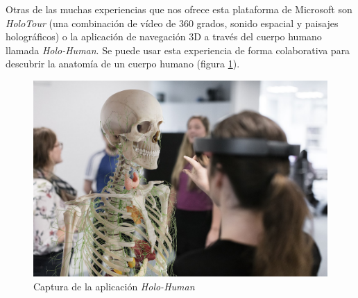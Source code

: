 Otras de las muchas experiencias que nos ofrece esta plataforma de Microsoft son \textit{HoloTour} (una combinación de vídeo de 360 grados, sonido espacial y paisajes holográficos) o la aplicación de navegación 3D a través del cuerpo humano llamada \textit{Holo-Human}. Se puede usar esta experiencia de forma colaborativa para descubrir la anatomía de un cuerpo humano (figura \ref{fig:capturaHoloHuman}).

\begin{figure}[h]
    \centering
    \includegraphics[scale=0.25]{Images/Estado del arte/holohuman.jpeg}
    \caption{Captura de la aplicación \textit{Holo-Human}}
    \label{fig:capturaHoloHuman}
\end{figure}



